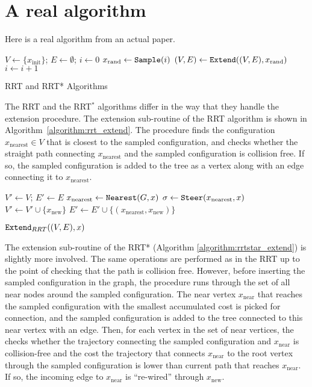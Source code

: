 \documentclass{article}
\begin{document}
\section{A real algorithm}

Here is a real algorithm from an actual paper.


\begin{algorithm}[t] \small
  $V \leftarrow \{ x_\mathrm{init}\}$; $E \leftarrow \emptyset$; $i\leftarrow 0$\; \label{line:initial}
   { \label{line:iteration_start}
    $x_\mathrm{rand} \leftarrow {\tt Sample}(i)$\;  \label{line:sample} 
    $(V, E)\leftarrow {\tt Extend}((V,E),x_\mathrm{rand})$\;  \label{line:extend}
    $i \leftarrow i + 1$\; \label{line:iteration_end}
  }
  \caption{RRT and RRT* Algorithms}
  \label{algorithm:RRT_body}
\end{algorithm}

The RRT and the RRT$^*$ algorithms differ in the way that they handle the extension procedure. 
%
The extension sub-routine of the RRT algorithm is shown in Algorithm~\ref{algorithm:rrt_extend}. 
%
The procedure finds the configuration $x_\mathrm{nearest} \in V$ that is closest to the sampled configuration, and checks whether the straight path connecting $x_\mathrm{nearest}$ and the sampled configuration is collision free. If so, the sampled configuration is added to the tree as a vertex along with an edge connecting it to $x_\mathrm{nearest}$.

\begin{algorithm}[t] \small
    $V' \leftarrow V$; $E' \leftarrow E$\;
    $x_\mathrm{nearest} \leftarrow {\tt Nearest} (G,x)$\; 
    $\sigma \leftarrow {\tt Steer} (x_\mathrm{nearest}, x)$\; 
    {
        $V' \leftarrow V' \cup \{x_\mathrm{new}\}$\; 
        $E' \leftarrow E' \cup \{ (x_\mathrm{nearest}, x_\mathrm{new})\}$\; 
    }
    \caption{${\tt Extend}_{RRT} ((V,E), x)$}
    \label{algorithm:rrt_extend}
\end{algorithm}

The extension sub-routine of the RRT* (Algorithm \ref{algorithm:rrtstar_extend}) is slightly more involved. 
%
The same operations are performed as in the RRT up to the point of checking that the path is collision free. 
%
However, before inserting the sampled configuration in the graph, the procedure runs through the set of all near nodes around the sampled configuration. The near vertex $x_\mathrm{near}$ that reaches the sampled configuration with the smallest accumulated cost is picked for connection, and the sampled configuration is added to the tree connected to this near vertex with an edge. 
%
Then, for each vertex in the set of near vertices, the checks whether the trajectory connecting the sampled configuration and $x_\mathrm{near}$ is collision-free and the cost the trajectory that connects $x_\mathrm{near}$ to the root vertex through the sampled configuration is lower than current path that reaches $x_\mathrm{near}$.
%
If so, the incoming edge to $x_\mathrm{near}$ is ``re-wired'' through $x_\mathrm{new}$.
\end{document}
